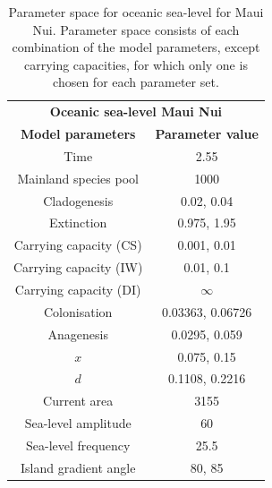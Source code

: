\begin{table}[ht]
    \centering
    \caption{Parameter space for oceanic sea-level for Maui Nui. Parameter space consists of each combination of the model parameters, except carrying capacities, for which only one is chosen for each parameter set.}
    \begin{tabular}{ c | c }
        \multicolumn{2}{c}{\textbf{Oceanic sea-level Maui Nui}} \\
        \textbf{Model parameters} & \textbf{Parameter value} \\ 
        \hline
        \hline
        Time & 2.55 \\
        \hline
        Mainland species pool & 1000 \\
        \hline
        Cladogenesis & 0.02, 0.04 \\
        \hline
        Extinction & 0.975, 1.95 \\
        \hline
        Carrying capacity (CS) & 0.001, 0.01 \\
        \hline
        Carrying capacity (IW) & 0.01, 0.1 \\
        \hline
        Carrying capacity (DI) & $\infty$ \\
        \hline
        Colonisation & 0.03363, 0.06726 \\
        \hline
        Anagenesis & 0.0295, 0.059 \\
        \hline
        $x$ & 0.075, 0.15 \\
        \hline
        $d$ & 0.1108, 0.2216 \\
        \hline
        Current area & 3155 \\
        \hline
        Sea-level amplitude & 60 \\
        \hline
        Sea-level frequency & 25.5 \\
        \hline
        Island gradient angle & 80, 85 \\
    \end{tabular}
    \label{tab:oceanic_sea_level_young}
\end{table}


